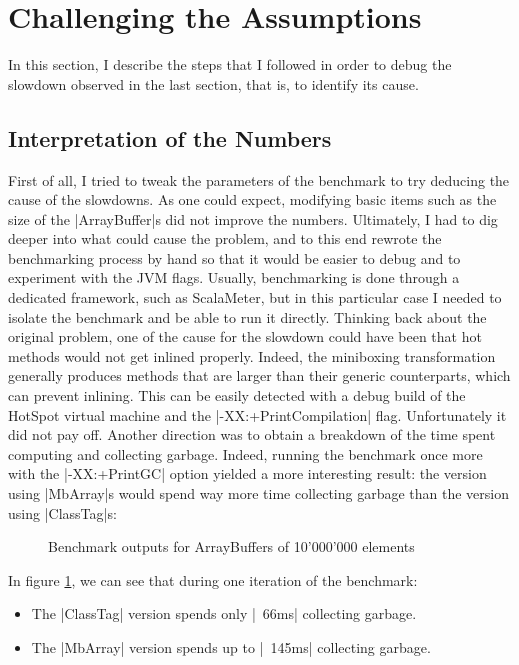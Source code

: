 
\section{Challenging the Assumptions}

In this section, I describe the steps that I followed in order to debug the slowdown observed in the last section, that is, to identify its cause.

\subsection{Interpretation of the Numbers}

First of all, I tried to tweak the parameters of the benchmark to try deducing the cause of the slowdowns. As one could expect, modifying basic items such as the size of the |ArrayBuffer|s did not improve the numbers. Ultimately, I had to dig deeper into what could cause the problem, and to this end rewrote the benchmarking process by hand so that it would be easier to debug and to experiment with the JVM flags. Usually, benchmarking is done through a dedicated framework, such as ScalaMeter, but in this particular case I needed to isolate the benchmark and be able to run it directly. Thinking back about the original problem, one of the cause for the slowdown could have been that hot methods would not get inlined properly. Indeed, the miniboxing transformation generally produces methods that are larger than their generic counterparts, which can prevent inlining. This can be easily detected with a debug build of the HotSpot virtual machine and the |-XX:+PrintCompilation| flag. Unfortunately it did not pay off. Another direction was to obtain a breakdown of the time spent computing and collecting garbage. Indeed, running the benchmark once more with the |-XX:+PrintGC| option yielded a more interesting result: the version using |MbArray|s would spend way more time collecting garbage than the version using |ClassTag|s:

\begin{figure}
\centering
{}
\caption{Benchmark outputs for ArrayBuffers of 10'000'000 elements}
\label{fig:GcComp}
\end{figure}

In figure \ref{fig:GcComp}, we can see that during one iteration of the benchmark:
\begin{itemize}
  \item The |ClassTag| version spends only |~66ms| collecting garbage.
  \item The |MbArray| version spends up to |~145ms| collecting garbage. 
\end{itemize} 

